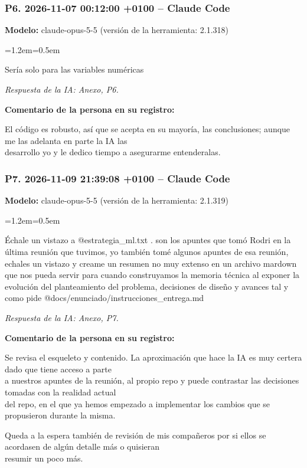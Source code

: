 \documentclass[11pt,a4paper]{article}
\newenvironment{prompt}
  {\par\smallskip\begin{list}{}{\leftmargin=1.2em\rightmargin=0.5em}\item\relax\small\color{black!80}}
  {\end{list}\smallskip}
\begin{document}
\subsubsection*{P6. 2026-11-07 00:12:00 +0100 -- Claude Code}
\textbf{Modelo:} claude-opus-5-5 (versión de la herramienta: 2.1.318)

\begin{prompt}
Sería solo para las variables numéricas
\end{prompt}

\textit{Respuesta de la IA: Anexo, P6.}

\textbf{Comentario de la persona en su registro:}

El código es robusto, así que se acepta en su mayoría, las conclusiones; aunque me las adelanta en parte la IA las \\{}
desarrollo yo y le dedico tiempo a asegurarme entenderalas.

\subsubsection*{P7. 2026-11-09 21:39:08 +0100 -- Claude Code}
\textbf{Modelo:} claude-opus-5-5 (versión de la herramienta: 2.1.319)

\begin{prompt}
Échale un vistazo a @estrategia\_\allowbreak{}ml.txt . son los apuntes que tomó Rodri en la última reunión que tuvimos, yo también tomé algunos apuntes de esa reunión, echales un vistazo y creame un resumen no muy extenso en un archivo mardown que nos pueda servir para cuando construyamos la memoria técnica al exponer la evolución del planteamiento del problema, decisiones de diseño y avances tal y como pide @docs/\allowbreak{}enunciado/\allowbreak{}instrucciones\_\allowbreak{}entrega.md
\end{prompt}

\textit{Respuesta de la IA: Anexo, P7.}

\textbf{Comentario de la persona en su registro:}

Se revisa el esqueleto y contenido. La aproximación que hace la IA es muy certera dado que tiene acceso a parte \\{}
a nuestros apuntes de la reunión, al propio repo y puede contrastar las decisiones tomadas con la realidad actual \\{}
del repo, en el que ya hemos empezado a implementar los cambios que se propusieron durante la misma.

Queda a la espera también de revisión de mis compañeros por si ellos se acordasen de algún detalle más o quisieran \\{}
resumir un poco más.
\end{document}
